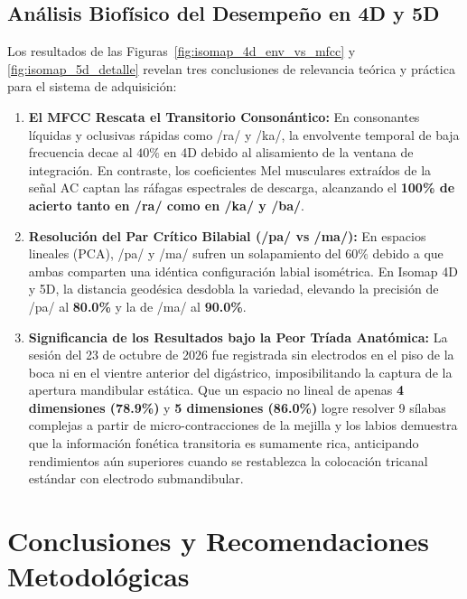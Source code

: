 \subsection{Análisis Biofísico del Desempeño en 4D y 5D}
Los resultados de las Figuras~\ref{fig:isomap_4d_env_vs_mfcc} y \ref{fig:isomap_5d_detalle} revelan tres conclusiones de relevancia teórica y práctica para el sistema de adquisición:
\begin{enumerate}
    \item \textbf{El MFCC Rescata el Transitorio Consonántico:} En consonantes líquidas y oclusivas rápidas como /ra/ y /ka/, la envolvente temporal de baja frecuencia decae al $40\%$ en 4D debido al alisamiento de la ventana de integración. En contraste, los coeficientes Mel musculares extraídos de la señal AC captan las ráfagas espectrales de descarga, alcanzando el \textbf{100\% de acierto tanto en /ra/ como en /ka/ y /ba/}.
    \item \textbf{Resolución del Par Crítico Bilabial (/pa/ vs /ma/):}
    En espacios lineales (PCA), /pa/ y /ma/ sufren un solapamiento del $60\%$ debido a que ambas comparten una idéntica configuración labial isométrica. En Isomap 4D y 5D, la distancia geodésica desdobla la variedad, elevando la precisión de /pa/ al \textbf{80.0\%} y la de /ma/ al \textbf{90.0\%}.
    \item \textbf{Significancia de los Resultados bajo la Peor Tríada Anatómica:}
    La sesión del 23 de octubre de 2026 fue registrada sin electrodos en el piso de la boca ni en el vientre anterior del digástrico, imposibilitando la captura de la apertura mandibular estática. Que un espacio no lineal de apenas \textbf{4 dimensiones (78.9\%)} y \textbf{5 dimensiones (86.0\%)} logre resolver 9 sílabas complejas a partir de micro-contracciones de la mejilla y los labios demuestra que la información fonética transitoria es sumamente rica, anticipando rendimientos aún superiores cuando se restablezca la colocación tricanal estándar con electrodo submandibular.
\end{enumerate}

\section{Conclusiones y Recomendaciones Metodológicas}
\label{sec:conclusiones_frecuencia_silabas}

